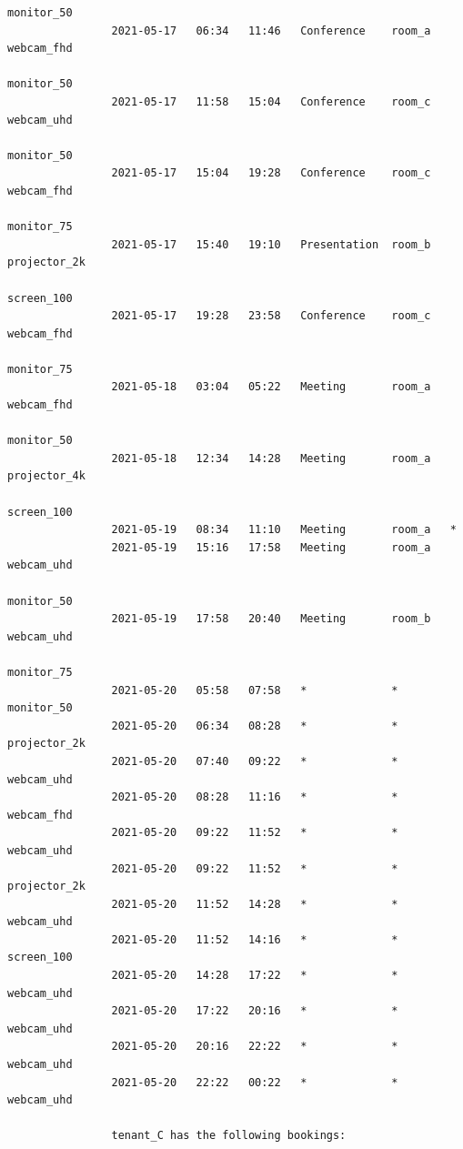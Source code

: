 \documentclass{article}
\begin{document}
\begin{Verbatim}[gobble=8]
                                                                    monitor_50
                2021-05-17   06:34   11:46   Conference    room_a   webcam_fhd
                                                                    monitor_50
                2021-05-17   11:58   15:04   Conference    room_c   webcam_uhd
                                                                    monitor_50
                2021-05-17   15:04   19:28   Conference    room_c   webcam_fhd
                                                                    monitor_75
                2021-05-17   15:40   19:10   Presentation  room_b   projector_2k
                                                                    screen_100
                2021-05-17   19:28   23:58   Conference    room_c   webcam_fhd
                                                                    monitor_75
                2021-05-18   03:04   05:22   Meeting       room_a   webcam_fhd
                                                                    monitor_50
                2021-05-18   12:34   14:28   Meeting       room_a   projector_4k
                                                                    screen_100
                2021-05-19   08:34   11:10   Meeting       room_a   *
                2021-05-19   15:16   17:58   Meeting       room_a   webcam_uhd
                                                                    monitor_50
                2021-05-19   17:58   20:40   Meeting       room_b   webcam_uhd
                                                                    monitor_75
                2021-05-20   05:58   07:58   *             *        monitor_50
                2021-05-20   06:34   08:28   *             *        projector_2k
                2021-05-20   07:40   09:22   *             *        webcam_uhd
                2021-05-20   08:28   11:16   *             *        webcam_fhd
                2021-05-20   09:22   11:52   *             *        webcam_uhd
                2021-05-20   09:22   11:52   *             *        projector_2k
                2021-05-20   11:52   14:28   *             *        webcam_uhd
                2021-05-20   11:52   14:16   *             *        screen_100
                2021-05-20   14:28   17:22   *             *        webcam_uhd
                2021-05-20   17:22   20:16   *             *        webcam_uhd
                2021-05-20   20:16   22:22   *             *        webcam_uhd
                2021-05-20   22:22   00:22   *             *        webcam_uhd
                
                tenant_C has the following bookings:
                

\end{Verbatim}
\end{document}
